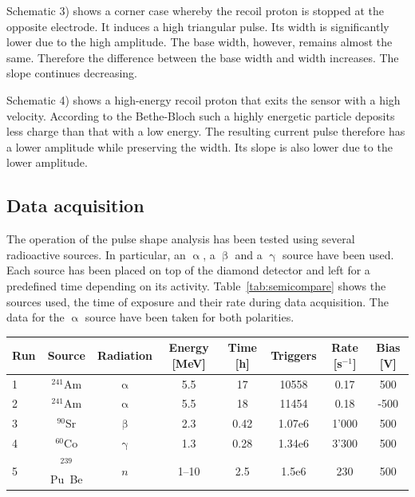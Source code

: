 Schematic 3) shows a corner case whereby the recoil proton is stopped at the opposite electrode. It induces a high triangular pulse. Its width is significantly lower due to the high amplitude. The base width, however, remains almost the same. Therefore the difference between the base width and width increases. The slope continues decreasing.

Schematic 4) shows a high-energy recoil proton that exits the sensor with a high velocity. According to the Bethe-Bloch such a highly energetic particle deposits less charge than that with a low energy. The resulting current pulse therefore has a lower amplitude while preserving the width. Its slope is also lower due to the lower amplitude.


\subsection{Data acquisition}
The operation of the pulse shape analysis has been tested using several radioactive sources. In particular, an $\upalpha$, a $\upbeta$ and a $\upgamma$ source have been used. Each source has been placed on top of the diamond detector and left for a predefined time depending on its activity. Table~\ref{tab:semicompare} shows the sources used, the time of exposure and their rate during data acquisition. The data for the $\upalpha$ source have been taken for both polarities. 

\begin{footnotesize}
\begin{center}
\begin{tabular}{l c c c c c c c}
\hline
Run & Source & Radiation & Energy [MeV] & Time [h]  & Triggers & Rate [s$^{-1}$]  & Bias [V]   \\
\hline
1&$^{241}$Am  & $\upalpha$ & 5.5 & 17 & 10558 & 0.17  & 500 \\
2&$^{241}$Am  & $\upalpha$ & 5.5 & 18 & 11454 & 0.18 & -500 \\
3&$^{90}$Sr  & $\upbeta$ & 2.3 & 0.42 & 1.07e6 & 1'000 & 500 \\
4&$^{60}$Co  & $\upgamma$ & 1.3 & 0.28 & 1.34e6 & 3'300 & 500 \\
5&$^{239}$Pu~Be  & $n$ & 1--10 & 2.5 & 1.5e6 & 230 & 500 \\ 
\hline
\end{tabular}
\label{tab:sources}
\end{center}
\end{footnotesize}

